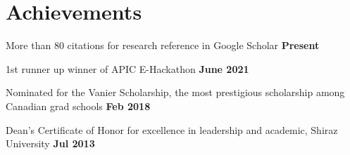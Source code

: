 \documentclass[letter,11pt]{article}
\begin{document}
\section{Achievements}
\begin{zitemize}
	\item More than 80 citations for research reference in Google Scholar \hfill \textbf{Present}
	\item 1st runner up winner of APIC E-Hackathon \hfill \textbf{June 2021}
	\item Nominated for the Vanier Scholarship, the most prestigious scholarship among Canadian grad schools \hfill \textbf{Feb 2018}
	\item Dean's Certificate of Honor for excellence in leadership and academic, Shiraz University \hfill \textbf{Jul 2013}
\end{zitemize}







\end{document}
